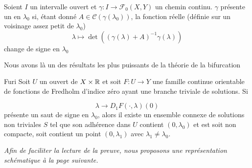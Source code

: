 \documentclass[memoire.tex]{subfiles}
\begin{document}
\begin{definition}
    Soient $I$ un intervalle ouvert et $\gamma: I\rightarrow \mathcal{F}_0(X,Y)$ un chemin continu. $\gamma$ présente un  en $\lambda_0$ si, étant donné $A\in\mathcal{C}(\gamma(\lambda_0))$, la fonction réelle (définie sur un voisinage assez petit de $\lambda_0$)
    \begin{equation*}
        \lambda\mapsto \det ((\gamma(\lambda)+A)^{-1}\gamma(\lambda))
    \end{equation*}
    change de signe en $\lambda_0$
\end{definition}
Nous avons là un des résultats les plus puissants de la théorie de la bifurcation
\begin{theobox}{Furi}{}
Soit $U$ un ouvert  de $X\times \mathbb{R}$ 
et soit $F:U\rightarrow Y$ une 
famille continue orientable de fonctions de 
Fredholm d'indice zéro ayant une branche triviale de solutions. Si 

\begin{equation*}
    \lambda\rightarrow D_1F(\cdot,\lambda)(0)
\end{equation*}
présente un saut de signe en $\lambda_0$, alors il existe un ensemble connexe de solutions non triviales $S$ tel que son adhérence dans $U$ contient $(0,\lambda_0)$ et est soit non compacte, soit contient un point $(0,\lambda_1)$ avec $\lambda_1\neq \lambda_0$.

\end{theobox}
\textit{Afin de faciliter la lecture de la preuve, nous proposons une représentation schématique à la page suivante.}
\end{document}
